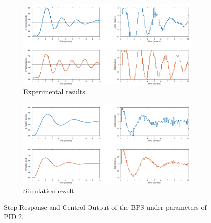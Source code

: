 \begin{figure}[h]
     \centering
     \begin{subfigure}[b]{1\textwidth}
         \centering
         \includegraphics[width=\textwidth]{Figures/chapter05/Step_response_PID2_Expiremental.png}
         \caption{Experimental results}
         \label{fig:y equals x}
     \end{subfigure}
     \hfill
     \begin{subfigure}[b]{1\textwidth}
         \centering
         \includegraphics[width=\textwidth]{Figures/chapter05/Step_response_PID2_Simulation.png}
         \caption{Simulation result}
         \label{fig:three sin x}
     \end{subfigure}
        \caption{Step Response and Control Output of the BPS under parameters of PID 2.}
        \label{fig:three graphs}
\end{figure}

